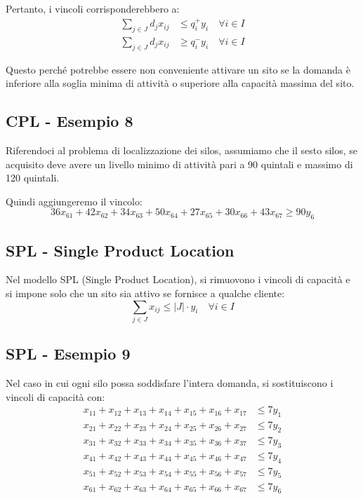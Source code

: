 Pertanto, i vincoli corrisponderebbero a:
\[
\begin{aligned}
\sum_{j \in J} d_j x_{ij} &\leq q_i^+ y_i \quad \forall i \in I \\
\sum_{j \in J} d_j x_{ij} &\geq q_i^- y_i \quad \forall i \in I
\end{aligned}
\]

Questo perché potrebbe essere non conveniente attivare un sito se la domanda è inferiore alla soglia minima di attività o 
superiore alla capacità massima del sito.

\subsection{CPL - Esempio 8}
Riferendoci al problema di localizzazione dei silos, assumiamo che 
il sesto silos, se acquisito deve avere un livello minimo di attività 
pari a 90 quintali e massimo di 120 quintali.

Quindi aggiungeremo il vincolo:
\[
36x_{61} + 42x_{62} + 34x_{63} + 50x_{64} + 27x_{65} + 30x_{66} + 43x_{67} \geq 90 y_6
\]

\subsection{SPL - Single Product Location}
Nel modello SPL (Single Product Location), si rimuovono i vincoli di capacità 
e si impone solo che un sito sia attivo se fornisce a qualche cliente:
\[
\sum_{j \in J} x_{ij} \leq |J| \cdot y_i \quad \forall i \in I
\]

\subsection{SPL - Esempio 9}
Nel caso in cui ogni silo possa soddisfare l'intera domanda, si sostituiscono 
i vincoli di capacità con:
\[
\begin{aligned}
x_{11} + x_{12} + x_{13} + x_{14} + x_{15} + x_{16} + x_{17} &\leq 7 y_1 \\
x_{21} + x_{22} + x_{23} + x_{24} + x_{25} + x_{26} + x_{27} &\leq 7 y_2 \\
x_{31} + x_{32} + x_{33} + x_{34} + x_{35} + x_{36} + x_{37} &\leq 7 y_3 \\
x_{41} + x_{42} + x_{43} + x_{44} + x_{45} + x_{46} + x_{47} &\leq 7 y_4 \\
x_{51} + x_{52} + x_{53} + x_{54} + x_{55} + x_{56} + x_{57} &\leq 7 y_5 \\
x_{61} + x_{62} + x_{63} + x_{64} + x_{65} + x_{66} + x_{67} &\leq 7 y_6
\end{aligned}
\]

